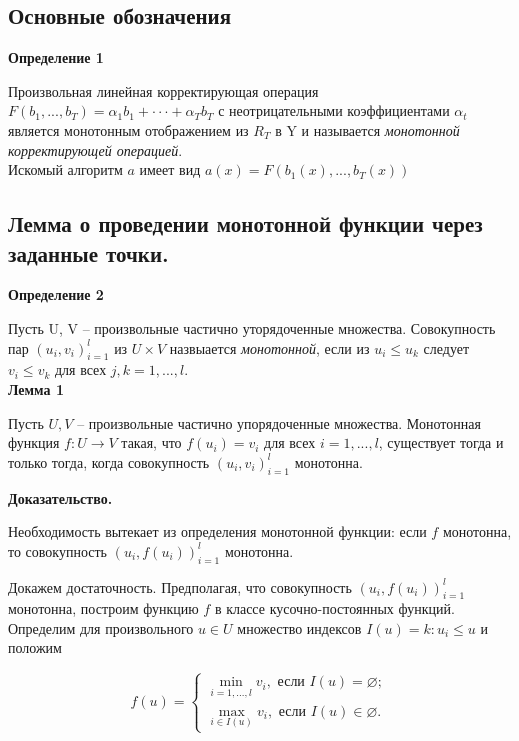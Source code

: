 \subsection{Основные обозначения}
\textbf{Определение 1}

Произвольная линейная корректирующая операция $F(b_1,... , b_T ) = \alpha_1 b_1 + · · · + \alpha_T b_T$ с неотрицательными коэффициентами $\alpha_t$ является монотонным отображением из $R_T$ в Y и называется \textit{монотонной корректирующей операцией}.\\

Искомый алгоритм $a$ имеет вид $a(x) = F(b_1(x), . . . , b_T (x))$

\subsection{Лемма о проведении монотонной функции через заданные точки.}

\textbf{Определение 2}

Пусть U, V -- произвольные частично уторядоченные множества. Совокупность пар $(u_i, v_i)_{i=1}^l$ из $U\times V$ назвыается \textit{монотонной}, если из $u_i\leq u_k$ следует $v_i\leq v_k$ для всех $j,k = 1,...,l.$\\

\textbf{Лемма 1}

Пусть  $U, V$ -- произвольные частично упорядоченные множества. Монотонная функция $f : U \longrightarrow V$ такая, что $f(u_i) = v_i$ для всех $i = 1, . . . , l$, существует
тогда и только тогда, когда совокупность $(u_i
    , v_i)^l_{i=1}$ монотонна.

\textbf{Доказательство.}

Необходимость вытекает из определения монотонной функции: если $f$ монотонна, то совокупность $(u_i,f(u_i))^l_{i=1}$ монотонна.

Докажем достаточность. Предполагая, что совокупность $(u_i,f(u_i))^l_{i=1}$ монотонна,
построим функцию $f$ в классе кусочно-постоянных функций. Определим для произвольного $u \in U $ множество индексов $I(u) = {k : u_i \leq u}$ и положим

\begin{equation*}
    f(u) =
    \begin{cases}
        \min\limits_{i=1,...,l}v_i, \text{ если } I(u) = \varnothing; \\
        \max\limits_{i\in I(u)}v_i, \text{ если } I(u) \in \varnothing .
    \end{cases}
\end{equation*}


